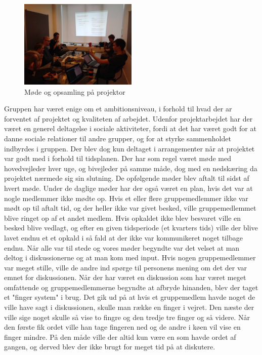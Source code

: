 \begin{figure}[ht!]
    \centering
    \includegraphics[width=0.5\textwidth]{Images/8.jpg}
    \caption{Møde og opsamling på projektor}
    \label{fig:4}
\end{figure}
Gruppen har været enige om et ambitionsniveau, i forhold til hvad der ar forventet af projektet og kvaliteten af arbejdet. Udenfor projektarbejdet har der været en generel deltagelse i sociale aktiviteter, fordi at det har været godt for at danne sociale relationer til andre grupper, og for at styrke sammenholdet indbyrdes i gruppen. Der blev dog kun deltaget i arrangementer når at projektet var godt med i forhold til tidsplanen. 
Der har som regel været møde med hovedvejleder hver uge, og bivejleder på samme måde, dog med en nedskæring da projektet nærmede sig sin slutning. De opfølgende møder blev aftalt til sidst af hvert møde. Under de daglige møder har der også været en plan, hvis det var at nogle medlemmer ikke mødte op. Hvis et eller flere gruppemedlemmer ikke var mødt op til aftalt tid, og der heller ikke var givet besked, ville gruppemedlemmet blive ringet op af et andet medlem. Hvis opkaldet ikke blev besvaret ville en besked blive vedlagt, og efter en given tidsperiode (et kvarters tids) ville der blive lavet endnu et et opkald i så fald at der ikke var kommunikeret noget tilbage endnu. Når alle var til stede og vores møder begyndte var det velset at man deltog i diskussionerne og at man kom med input. Hvis nogen gruppemedlemmer var meget stille, ville de andre ind spørge til personens mening om det der var emnet for diskussionen. Når der har været en diskussion som har været meget omfattende og gruppemedlemmerne begyndte at afbryde hinanden, blev der taget et "finger system" i brug. Det gik ud på at hvis et gruppemedlem havde noget de ville have sagt i diskussionen, skulle man række en finger i vejret. Den næste der ville sige noget skulle så vise to fingre og den tredje tre finger og så videre. Når den første fik ordet ville han tage fingeren ned og de andre i køen vil vise en finger mindre. På den måde ville der altid kun være en som havde ordet af gangen, og derved blev der ikke brugt for meget tid på at diskutere.

